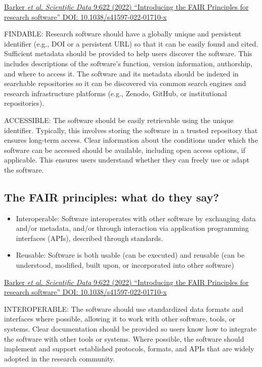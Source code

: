 \documentclass[
  letterpaper,
  DIV=11,
  numbers=noendperiod]{scrartcl}
\begin{document}
\href{https://dx.doi.org/10.1038/s41597-022-01710-x}{Barker \emph{et
al.} \emph{Scientific Data} 9:622 (2022) ``Introducing the FAIR
Principles for research software'' DOI: 10.1038/s41597-022-01710-x}

FINDABLE: Research software should have a globally unique and persistent
identifier (e.g., DOI or a persistent URL) so that it can be easily
found and cited. Sufficient metadata should be provided to help users
discover the software. This includes descriptions of the software's
function, version information, authorship, and where to access it. The
software and its metadata should be indexed in searchable repositories
so it can be discovered via common search engines and research
infrastructure platforms (e.g., Zenodo, GitHub, or institutional
repositories).

ACCESSIBLE: The software should be easily retrievable using the unique
identifier. Typically, this involves storing the software in a trusted
repository that ensures long-term access. Clear information about the
conditions under which the software can be accessed should be available,
including open access options, if applicable. This ensures users
understand whether they can freely use or adapt the software.

\subsection{The FAIR principles: what do they
say?}\label{the-fair-principles-what-do-they-say-1}

\begin{itemize}
\item
  {Interoperable}: Software interoperates with other software by
  exchanging data and/or metadata, and/or through interaction via
  application programming interfaces (APIs), described through
  standards.
\item
  {Reusable}: Software is both usable (can be executed) and reusable
  (can be understood, modified, built upon, or incorporated into other
  software)
\end{itemize}

\href{https://dx.doi.org/10.1038/s41597-022-01710-x}{Barker \emph{et
al.} \emph{Scientific Data} 9:622 (2022) ``Introducing the FAIR
Principles for research software'' DOI: 10.1038/s41597-022-01710-x}

INTEROPERABLE: The software should use standardized data formats and
interfaces where possible, allowing it to work with other software,
tools, or systems. Clear documentation should be provided so users know
how to integrate the software with other tools or systems. Where
possible, the software should implement and support established
protocols, formats, and APIs that are widely adopted in the research
community.
\end{document}
